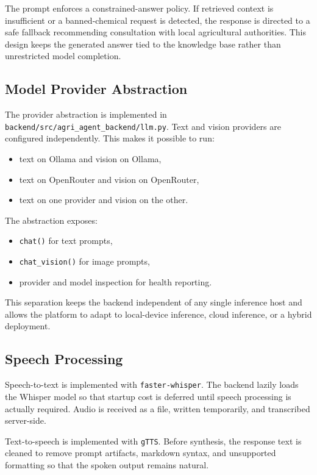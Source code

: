 \documentclass[11pt,a4paper]{article}
\begin{document}
The prompt enforces a constrained-answer policy. If retrieved context is insufficient or a banned-chemical request is detected, the response is directed to a safe fallback recommending consultation with local agricultural authorities. This design keeps the generated answer tied to the knowledge base rather than unrestricted model completion.

\subsection{Model Provider Abstraction}

The provider abstraction is implemented in \texttt{backend/src/agri\_agent\_backend/llm.py}. Text and vision providers are configured independently. This makes it possible to run:

\begin{itemize}
  \item text on Ollama and vision on Ollama,
  \item text on OpenRouter and vision on OpenRouter,
  \item text on one provider and vision on the other.
\end{itemize}

The abstraction exposes:

\begin{itemize}
  \item \texttt{chat()} for text prompts,
  \item \texttt{chat\_vision()} for image prompts,
  \item provider and model inspection for health reporting.
\end{itemize}

This separation keeps the backend independent of any single inference host and allows the platform to adapt to local-device inference, cloud inference, or a hybrid deployment.

\subsection{Speech Processing}

Speech-to-text is implemented with \texttt{faster-whisper}. The backend lazily loads the Whisper model so that startup cost is deferred until speech processing is actually required. Audio is received as a file, written temporarily, and transcribed server-side.

Text-to-speech is implemented with \texttt{gTTS}. Before synthesis, the response text is cleaned to remove prompt artifacts, markdown syntax, and unsupported formatting so that the spoken output remains natural.
\end{document}
